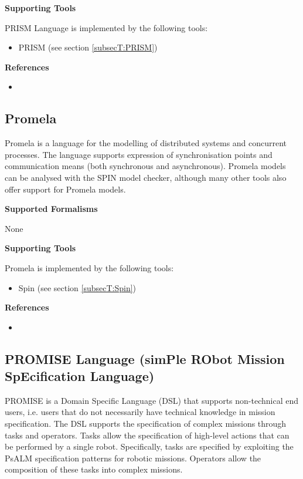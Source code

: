 \textbf{Supporting Tools}

PRISM Language is implemented by the following tools:
\begin{itemize}
	\item PRISM (see section \ref{subsecT:PRISM})
\end{itemize}


\textbf{References}
\begin{itemize}
	
\item {}
\end{itemize}



\subsection{Promela}
\label{subsecL:Promela}


Promela is a language for the modelling of distributed systems and concurrent processes. The language supports expression of synchronisation points and communication means (both synchronous and asynchronous). Promela models can be analysed with the SPIN model checker, although many other tools also offer support for Promela models.

\textbf{Supported Formalisms}

None


\textbf{Supporting Tools}

Promela is implemented by the following tools:
\begin{itemize}
	\item Spin (see section \ref{subsecT:Spin})
\end{itemize}


\textbf{References}
\begin{itemize}
	
\item {}
\end{itemize}



\subsection{PROMISE Language (simPle RObot Mission SpEcification Language)}
\label{subsecL:PROMISEDSL}


PROMISE is a Domain Specific Language (DSL) that supports non-technical end users, i.e. users that do not necessarily have technical knowledge in mission specification. The DSL supports the specification of complex missions through tasks and operators. Tasks allow the specification of high-level actions that can be performed by a single robot. Specifically, tasks are specified by exploiting the PsALM specification patterns for robotic missions. Operators allow the composition of these tasks into complex missions.

